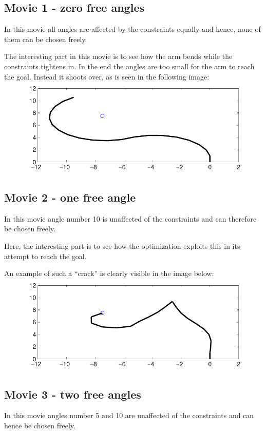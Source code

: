 \documentclass[10pt,oneside,a4paper,final,english]{memoir}
\begin{document}
\subsection{Movie 1 - zero free angles}
In this movie all angles are affected by the constraints equally and
hence, none of them can be chosen freely.

The interesting part in this movie is to see how the arm bends while
the constraints tightens in. In the end the angles are too small for
the arm to reach the goal. Instead it shoots over, as is seen in the
following image:
\includegraphics[width=\textwidth]{images/movie1.pdf}

\subsection{Movie 2 - one free angle}
In this movie angle number 10 is unaffected of the constraints and can
therefore be chosen freely.

Here, the interesting part is to see how the optimization exploits
this in its attempt to reach the goal.

An example of such a ``crack'' is clearly visible in the image below:\\
\includegraphics[width=\textwidth]{images/movie2.pdf}

\subsection{Movie 3 - two free angles}
In this movie angles number 5 and 10 are unaffected of the constraints
and can hence be chosen freely.
\end{document}
